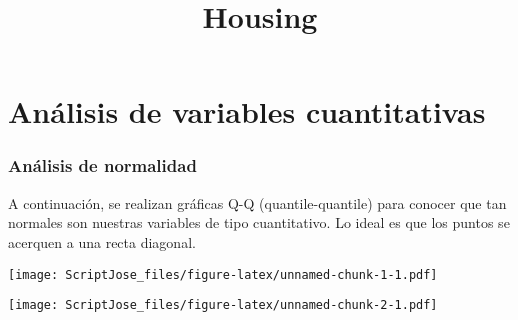 \documentclass[
]{article}
\title{Housing}
\author{}
\date{\vspace{-2.5em}}
\newenvironment{Shaded}{\begin{snugshade}}{\end{snugshade}}
\newcommand{\DataTypeTok}[1]{\textcolor[rgb]{0.13,0.29,0.53}{#1}}
\newcommand{\KeywordTok}[1]{\textcolor[rgb]{0.13,0.29,0.53}{\textbf{#1}}}
\newcommand{\NormalTok}[1]{#1}
\newcommand{\OperatorTok}[1]{\textcolor[rgb]{0.81,0.36,0.00}{\textbf{#1}}}
\newcommand{\StringTok}[1]{\textcolor[rgb]{0.31,0.60,0.02}{#1}}
\begin{document}
\maketitle

\hypertarget{anuxe1lisis-de-variables-cuantitativas}{%
\section{Análisis de variables
cuantitativas}\label{anuxe1lisis-de-variables-cuantitativas}}

\hypertarget{anuxe1lisis-de-normalidad}{%
\subsubsection{Análisis de normalidad}\label{anuxe1lisis-de-normalidad}}

A continuación, se realizan gráficas Q-Q (quantile-quantile) para
conocer que tan normales son nuestras variables de tipo cuantitativo. Lo
ideal es que los puntos se acerquen a una recta diagonal.

\begin{Shaded}
\end{Shaded}

\texttt{[image: ScriptJose\_files/figure-latex/unnamed-chunk-1-1.pdf]}

\begin{Shaded}
\end{Shaded}

\texttt{[image: ScriptJose\_files/figure-latex/unnamed-chunk-2-1.pdf]}
\end{document}
